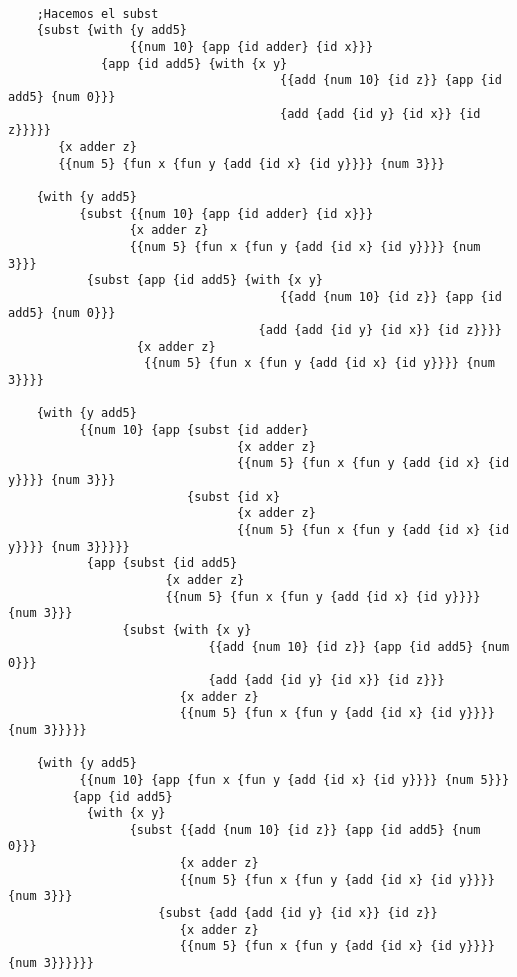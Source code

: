 \documentclass[a4paper]{article}
\begin{document}
\begin{verbatim}

	;Hacemos el subst
	{subst {with {y add5}
	             {{num 10} {app {id adder} {id x}}}
             {app {id add5} {with {x y}
    	                              {{add {num 10} {id z}} {app {id add5} {num 0}}}
                                      {add {add {id y} {id x}} {id z}}}}}
       {x adder z}
       {{num 5} {fun x {fun y {add {id x} {id y}}}} {num 3}}}

	{with {y add5}
    	  {subst {{num 10} {app {id adder} {id x}}}
        	     {x adder z}
            	 {{num 5} {fun x {fun y {add {id x} {id y}}}} {num 3}}}
	       {subst {app {id add5} {with {x y}
    	                              {{add {num 10} {id z}} {app {id add5} {num 0}}}
                                   {add {add {id y} {id x}} {id z}}}}
            	  {x adder z}
	               {{num 5} {fun x {fun y {add {id x} {id y}}}} {num 3}}}}
	
	{with {y add5}
	      {{num 10} {app {subst {id adder}
	                            {x adder z}
	                            {{num 5} {fun x {fun y {add {id x} {id y}}}} {num 3}}}
    	                 {subst {id x}
        	                    {x adder z}
            	                {{num 5} {fun x {fun y {add {id x} {id y}}}} {num 3}}}}}
	       {app {subst {id add5}
    	              {x adder z}
        	          {{num 5} {fun x {fun y {add {id x} {id y}}}} {num 3}}}
	            {subst {with {x y}
    	                    {{add {num 10} {id z}} {app {id add5} {num 0}}}
        	                {add {add {id y} {id x}} {id z}}}
            	        {x adder z}
                	    {{num 5} {fun x {fun y {add {id x} {id y}}}} {num 3}}}}}

	{with {y add5}
	      {{num 10} {app {fun x {fun y {add {id x} {id y}}}} {num 5}}}
    	 {app {id add5}
       	   {with {x y}
           	     {subst {{add {num 10} {id z}} {app {id add5} {num 0}}}
               	        {x adder z}
                   	    {{num 5} {fun x {fun y {add {id x} {id y}}}} {num 3}}}
	                 {subst {add {add {id y} {id x}} {id z}}
   	                    {x adder z}
       	                {{num 5} {fun x {fun y {add {id x} {id y}}}} {num 3}}}}}}
	

\end{verbatim}
\end{document}
